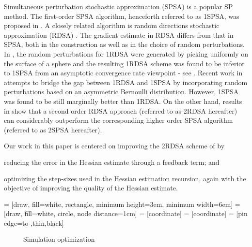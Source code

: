 \documentclass[letterpaper, 10 pt, conference]{ieeeconf}  %
\begin{document}
Simultaneous perturbation stochastic approximation (SPSA) is a popular SP method. The first-order SPSA algorithm, henceforth referred to as 1SPSA, was proposed in \cite{spall}.  A closely related algorithm is random directions stochastic approximation (RDSA) \cite[pp.~58-60]{kushcla}. The gradient estimate in RDSA differs from that in SPSA, both in the construction as well as in the choice of random perturbations.  In \cite{kushcla}, the random perturbations for 1RDSA were generated by picking uniformly on the surface of a sphere and the resulting 1RDSA scheme was found to be  inferior to 1SPSA from an asymptotic convergence rate viewpoint - see \cite{chin1997comparative}.  Recent work in \cite{prashanth2015rdsa} attempts to bridge the gap between 1RDSA and 1SPSA by incorporating random perturbations based on an asymmetric Bernoulli distribution. However,  1SPSA was found to be still marginally better than 1RDSA. 
On the other hand, results in \cite{prashanth2015rdsa} show that a second order RDSA approach (referred to as 2RDSA hereafter) can considerably outperform the corresponding higher order SPSA algorithm \cite{spall_adaptive} (referred to as 2SPSA hereafter).  

Our work in this paper is centered on improving the 2RDSA scheme of \cite{prashanth2015rdsa} by \\
\begin{inparaenum}[\bfseries (i)]
\item reducing the error in the Hessian estimate through a feedback term; and\\
\item optimizing the step-sizes used in the Hessian estimation recursion, again with the objective of improving the quality of the Hessian estimate.
\end{inparaenum}

 = [draw, fill=white, rectangle,
   minimum height=3em, minimum width=6em]
 = [draw, fill=white, circle, node distance=1cm]
 = [coordinate]
 = [coordinate]
 = [pin edge={to-,thin,black}]

 \begin{figure}[t]
    \centering
{}
\caption{Simulation optimization}
\label{fig:so}
\end{figure}
\end{document}
